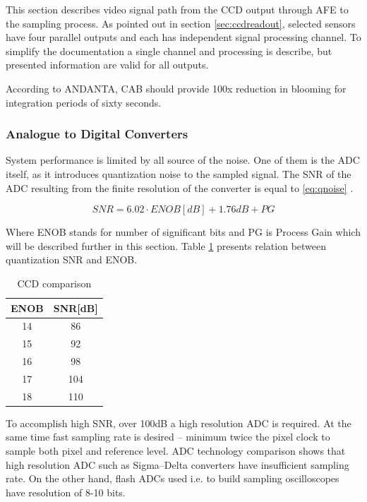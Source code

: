 This section describes video signal path from the CCD output through AFE to the sampling process. As pointed out in section \ref{sec:ccdreadout}, selected sensors have four parallel outputs and each has independent signal processing channel. To simplify the documentation a single channel and processing is describe, but presented information are valid for all outputs.

According to ANDANTA, CAB should provide 100x reduction in blooming for integration periods of sixty seconds.

\subsubsection{Analogue to Digital Converters}

System performance is limited by all source of the noise. One of them is the ADC itself, as it introduces quantization noise to the sampled signal. The SNR of the ADC resulting from the finite resolution of the converter is equal to \ref{eq:qnoise} \cite{mt-001}.

\begin{equation}
\label{eq:qnoise}
SNR = 6.02 \cdot ENOB[dB] + 1.76dB + PG
\end{equation}

Where ENOB stands for number of significant bits and PG is Process Gain which will be described further in this section. Table \ref{tab:qnoisetab} presents relation between quantization SNR and ENOB.

\begin{table}[ht!]
\centering
\caption{CCD comparison}
\label{tab:qnoisetab}
\begin{tabular}{c|c}
ENOB & SNR[dB] \\ \hline 
14 & 86 \\ \hline 
15 & 92 \\ \hline 
16 & 98 \\ \hline 
17 & 104 \\ \hline 
18 & 110 \\ 
\end{tabular}
\end{table}

To accomplish high SNR, over 100dB a high resolution ADC is required. At the same time fast sampling rate is desired -- minimum twice the pixel clock to sample both pixel and reference level. ADC technology comparison shows that high resolution ADC such as Sigma--Delta converters have insufficient sampling rate. On the other hand, flash ADCs used i.e. to build sampling oscilloscopes have resolution of 8-10 bits. 

